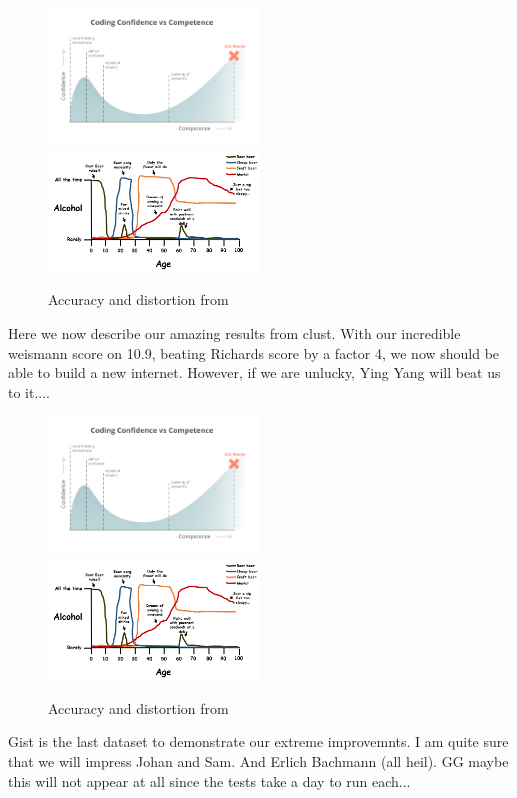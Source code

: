 \begin{figure}[h]
\includegraphics[width=0.5\textwidth]{figures/coding_graph}
\includegraphics[width=0.5\textwidth]{figures/alcohol_graph}
\caption{Accuracy and distortion from \clust{}}
\label{fig:graph clust}
\end{figure}
Here we now describe our amazing results from clust. With our incredible weismann score on 10.9, beating Richards score by a factor 4, we now should be able to build a new internet. However, if we are unlucky, Ying Yang will beat us to it....
\clearpage{}

\begin{figure}[h]
\includegraphics[width=0.5\textwidth]{figures/coding_graph}
\includegraphics[width=0.5\textwidth]{figures/alcohol_graph}
\caption{Accuracy and distortion from \gist{}}
\label{fig:graph gist}
\end{figure}
Gist is the last dataset to demonstrate our extreme improvemnts. I am quite sure that we will impress Johan and Sam. And Erlich Bachmann (all heil). GG maybe this will not appear at all since the tests take a day to run each...

